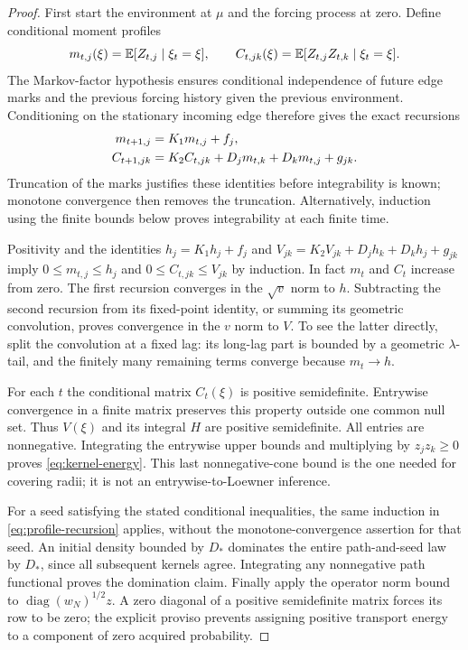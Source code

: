 \begin{proof}
First start the environment at $\mu$ and the forcing process at zero. Define conditional moment profiles
\[
 m_{t,j}(\xi)=\mathbb E[Z_{t,j}\mid\xi_t=\xi],\qquad
 C_{t,jk}(\xi)=\mathbb E[Z_{t,j}Z_{t,k}\mid\xi_t=\xi].
\]
The Markov-factor hypothesis ensures conditional independence of future edge marks and the previous forcing history given the previous environment. Conditioning on the stationary incoming edge therefore gives the exact recursions
\begin{align}
 m_{t+1,j}&=K_1m_{t,j}+f_j,\label{eq:profile-recursion}\\
 C_{t+1,jk}&=K_2C_{t,jk}+D_jm_{t,k}+D_km_{t,j}+g_{jk}.\notag
\end{align}
Truncation of the marks justifies these identities before integrability is known; monotone convergence then removes the truncation. Alternatively, induction using the finite bounds below proves integrability at each finite time.

Positivity and the identities $h_j=K_1h_j+f_j$ and
$V_{jk}=K_2V_{jk}+D_jh_k+D_kh_j+g_{jk}$ imply
$0\le m_{t,j}\le h_j$ and $0\le C_{t,jk}\le V_{jk}$ by induction. In fact $m_t$ and $C_t$ increase from zero. The first recursion converges in the $\sqrt v$ norm to $h$. Subtracting the second recursion from its fixed-point identity, or summing its geometric convolution, proves convergence in the $v$ norm to $V$. To see the latter directly, split the convolution at a fixed lag: its long-lag part is bounded by a geometric $\lambda$-tail, and the finitely many remaining terms converge because $m_t\to h$.

For each $t$ the conditional matrix $C_t(\xi)$ is positive semidefinite. Entrywise convergence in a finite matrix preserves this property outside one common null set. Thus $V(\xi)$ and its integral $H$ are positive semidefinite. All entries are nonnegative. Integrating the entrywise upper bounds and multiplying by $z_jz_k\ge0$ proves \eqref{eq:kernel-energy}. This last nonnegative-cone bound is the one needed for covering radii; it is not an entrywise-to-Loewner inference.

For a seed satisfying the stated conditional inequalities, the same induction in \eqref{eq:profile-recursion} applies, without the monotone-convergence assertion for that seed. An initial density bounded by $D_*$ dominates the entire path-and-seed law by $D_*$, since all subsequent kernels agree. Integrating any nonnegative path functional proves the domination claim. Finally apply the operator norm bound to $\operatorname{diag}(w_N)^{1/2}z$. A zero diagonal of a positive semidefinite matrix forces its row to be zero; the explicit proviso prevents assigning positive transport energy to a component of zero acquired probability.
\end{proof}

